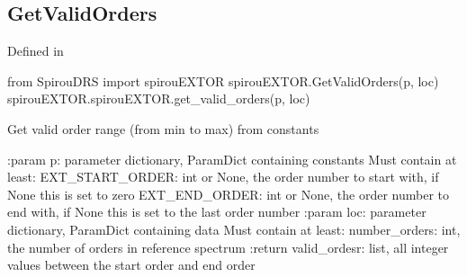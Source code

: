 \noindent\begin{minipage}{\textwidth}
\subsection{GetValidOrders}

Defined in \spirouEXTOR{}
\begin{pythonbox}
from SpirouDRS import spirouEXTOR
spirouEXTOR.GetValidOrders(p, loc)
spirouEXTOR.spirouEXTOR.get_valid_orders(p, loc)
\end{pythonbox}

\begin{pythondocstring}
Get valid order range (from min to max) from constants

:param p: parameter dictionary, ParamDict containing constants
    Must contain at least:
        EXT_START_ORDER: int or None, the order number to start with, if
                         None this is set to zero
        EXT_END_ORDER: int or None, the order number to end with, if None
                       this is set to the last order number
:param loc: parameter dictionary, ParamDict containing data
        Must contain at least:
            number_orders: int, the number of orders in reference spectrum
:return valid_ordesr: list, all integer values between the start order and
                      end order
\end{pythondocstring}
\end{minipage}


